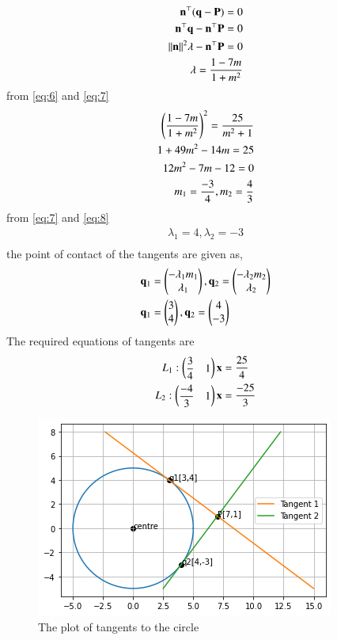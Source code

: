 \documentclass[journal,12pt,twocolumn]{IEEEtran}
\begin{document}
\begin{align}
\mathbf{n}^{\top}(\mathbf{q} -\mathbf{P} ) = 0\\
\mathbf{n}^{\top}\mathbf{q} -\mathbf{n}^{\top}\mathbf{P}  = 0\\
\lVert\mathbf{n}\rVert^{2}\lambda -\mathbf{n}^{\top}\mathbf{P}  = 0\\
\lambda = \dfrac{1- 7m}{1+ m^{2}} \label{eq:7}
\end{align}
from \eqref{eq:6} and \eqref{eq:7}
\begin{align}
\left(\dfrac{1- 7m}{1+ m^{2}}\right)^{2} = \dfrac{25}{m^{2} + 1}\\
1+ 49m^{2} -14m = 25\\
12m^{2} -7m - 12=0\\
m_{1} =\dfrac{-3}{4} , m_{2} =\dfrac{4}{3} \label{eq:8}
\end{align}
from \eqref{eq:7} and \eqref{eq:8}
\begin{align}
\lambda_{1}= 4 , \lambda_{2}= -3\\
\end{align}
the point of contact of the tangents are given as,
\begin{align}
\mathbf{q}_{1} &=\begin{pmatrix}-\lambda_{1} m _{1}\\ \lambda_{1}\end{pmatrix},\mathbf{q}_{2} =\begin{pmatrix}-\lambda_{2} m _{2}\\ \lambda_{2}\end{pmatrix}\\
\mathbf{q}_{1} &=\begin{pmatrix}3\\ 4\end{pmatrix},\mathbf{q}_{2} =\begin{pmatrix}4\\-3\end{pmatrix}
\end{align}
The required equations of tangents are
\begin{align}
    L_1: \begin{pmatrix}\dfrac{3}{4}&1\end{pmatrix}\mathbf{x}&=\dfrac{25}{4}\\
    L_2: \begin{pmatrix}\dfrac{-4}{3}&1\end{pmatrix}\mathbf{x}&=\dfrac{-25}{3}
\end{align}
\begin{figure}[!ht]
   \centering
   \includegraphics[width=\columnwidth]{fig_A_3.png}
   \caption{The plot of tangents to the circle }
\end{figure}
\end{document}
